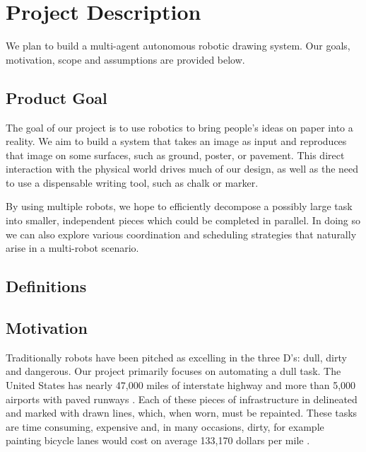 
\section{Project Description}
\label{sec:project_description}
We plan to build a multi-agent autonomous robotic drawing system. Our goals, motivation,  scope and assumptions are provided below.

\subsection{Product Goal}
\label{sec:project_goal}
The goal of our project is to use robotics to bring people's ideas on paper into a reality. 
We aim to build a system that takes an image as input and reproduces that image on some surfaces, such as ground, poster, or pavement.
This direct interaction with the physical world drives much of our design, as well as the need to use a dispensable writing tool, such as chalk or marker. 

By using multiple robots, we hope to efficiently decompose a possibly large task into smaller, independent pieces which could be completed in parallel.
In doing so we can also explore various coordination and scheduling strategies that naturally arise in a multi-robot scenario. 

\subsection{Definitions}
\label{sec:definitions}


\subsection{Motivation}
\label{sec:motivation}

Traditionally robots have been pitched as excelling in the three D's: dull, dirty and dangerous. Our project primarily focuses on automating a dull task. The United States has nearly 47,000 miles of interstate highway and more than 5,000 airports with paved runways \cite{buildfuture}. Each of these pieces of infrastructure in delineated and marked with drawn lines, which, when worn, must be repainted. These tasks are time consuming, expensive and, in many occasions, dirty, for example painting bicycle lanes would cost on average 133,170 dollars per mile \cite{bicyclist}.


